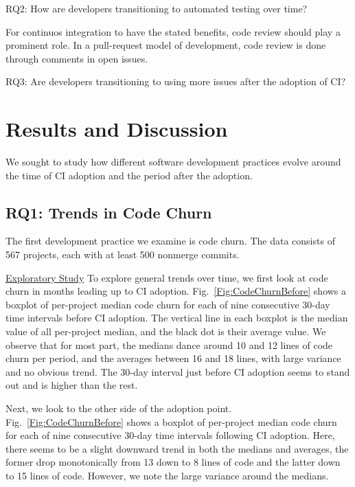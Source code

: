 \documentclass[conference]{IEEEtran}
\begin{document}
RQ2: How are developers transitioning to automated testing over time?

For continuos integration to have the stated benefits, code review should play a prominent role. In a pull-request model of development, code review is done through comments in open issues.

RQ3: Are developers transitioning to using more issues after the adoption of CI?





\section{Results and Discussion}

We sought to study how different software development practices evolve around the time of CI adoption and the period after the adoption.


\subsection{RQ1: Trends in Code Churn}

The first development practice we examine is code churn.
The data consists of 567 projects, each with at least 500 nonmerge commits.

\noindent \underline{Exploratory Study} To explore general trends over time, we first look at code churn in months leading up to CI adoption.
Fig.~\ref{Fig:CodeChurnBefore} shows a boxplot of per-project median code churn for each of nine consecutive 30-day time intervals before CI adoption.
The vertical line in each boxplot is the median value of all per-project median, and the black dot is their average value.
We observe that for most part, the medians dance around 
10 and 12 lines of code churn per period, and the averages between 16 and 18 lines, with large variance and no obvious trend. The 30-day interval just before CI adoption seems to stand out and is higher than the rest.

Next, we look to the other side of the adoption point. Fig.~\ref{Fig:CodeChurnBefore} shows a boxplot of per-project median code churn for each of nine consecutive 30-day time intervals following CI adoption.
Here,  there seems to be a slight downward trend in both the medians and averages, the former drop monotonically from 13 down to 8 lines of code and the latter down to 15 lines of code.
However, we note the large variance around the medians.
\end{document}
